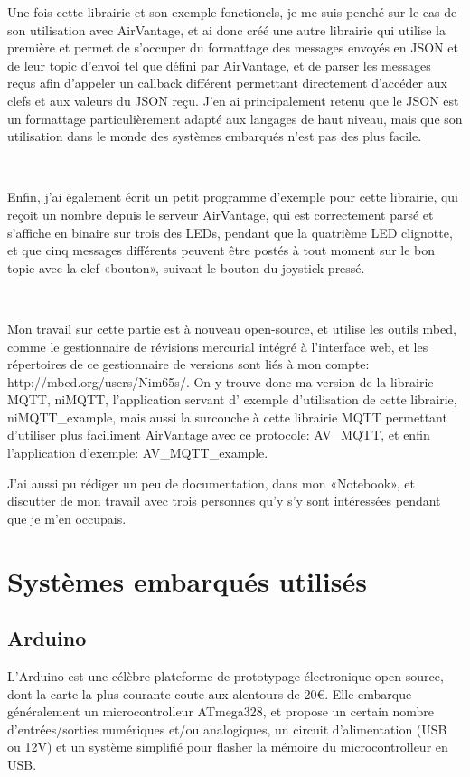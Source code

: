 \documentclass{article}
\begin{document}
Une fois cette librairie et son exemple fonctionels, je me suis penché sur le cas de son utilisation avec AirVantage, et ai donc créé une autre librairie qui utilise la première et permet de s’occuper du formattage des messages envoyés en JSON et de leur topic d’envoi tel que défini par AirVantage, et de parser les messages reçus afin d’appeler un callback différent permettant directement d’accéder aux clefs et aux valeurs du JSON reçu. J’en ai principalement retenu que le JSON est un formattage particulièrement adapté aux langages de haut niveau, mais que son utilisation dans le monde des systèmes embarqués n’est pas des plus facile.

~

Enfin, j’ai également écrit un petit programme d’exemple pour cette librairie, qui reçoit un nombre depuis le serveur AirVantage, qui est correctement parsé et s’affiche en binaire sur trois des LEDs, pendant que la quatrième LED clignotte, et que cinq messages différents peuvent être postés à tout moment sur le bon topic avec la clef «bouton», suivant le bouton du joystick pressé.


~

Mon travail sur cette partie est à nouveau open-source, et utilise les outils mbed, comme le gestionnaire de révisions mercurial intégré à l’interface web, et les répertoires de ce gestionnaire de versions sont liés à mon compte: http://mbed.org/users/Nim65s/. On y trouve donc ma version de la librairie MQTT, niMQTT, l’application servant d’ exemple d’utilisation de cette librairie, niMQTT\_example, mais aussi la surcouche à cette librairie MQTT permettant d’utiliser plus faciliment AirVantage avec ce protocole: AV\_MQTT, et enfin l’application d’exemple: AV\_MQTT\_example.

J’ai aussi pu rédiger un peu de documentation, dans mon «Notebook», et discutter de mon travail avec trois personnes qu’y s’y sont intéressées pendant que je m’en occupais.

\clearpage

\appendix
\section{Systèmes embarqués utilisés}

\subsection{Arduino}
\label{arduino}

L’Arduino est une célèbre plateforme de prototypage électronique open-source, dont la carte la plus courante coute aux alentours de 20€.
Elle embarque généralement un microcontrolleur ATmega328, et propose un certain nombre d’entrées/sorties numériques et/ou analogiques, un circuit d’alimentation (USB ou 12V) et un système simplifié pour flasher la mémoire du microcontrolleur en USB.
\end{document}
